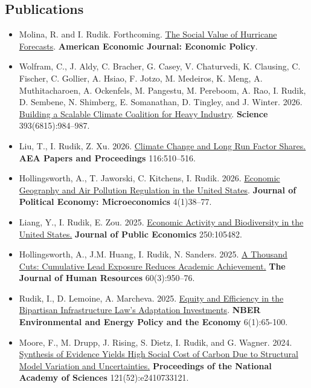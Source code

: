 \documentclass[11pt]{res} %
\begin{document}
\begin{resume}
\subsection{Publications}
\begin{itemize}
	\item[] Molina, R. and I. Rudik. Forthcoming. \href{https://www.nber.org/papers/w32548}{The Social Value of Hurricane Forecasts}. \textbf{American Economic Journal: Economic Policy}.
	\item[] Wolfram, C., J. Aldy, C. Bracher, G. Casey, V. Chaturvedi, K. Clausing, C. Fischer, C. Gollier, A. Hsiao, F. Jotzo, M. Medeiros, K. Meng, A. Muthitacharoen, A. Ockenfels, M. Pangestu, M. Pereboom, A. Rao, I. Rudik, D. Sembene, N. Shimberg, E. Somanathan, D. Tingley, and J. Winter. 2026. \href{https://www.science.org/doi/abs/10.1126/science.aef7190}{Building a Scalable Climate Coalition for Heavy Industry}. \textbf{Science} 393(6815):984--987.
	\item[] Liu, T., I. Rudik, Z. Xu. 2026. \href{https://pubs.aeaweb.org/doi/pdfplus/10.1257/pandp.20261025}{Climate Change and Long Run Factor Shares.} \textbf{AEA Papers and Proceedings} 116:510–516.
	\item[] Hollingsworth, A., T. Jaworski, C. Kitchens, I. Rudik. 2026. \href{https://www.journals.uchicago.edu/doi/10.1086/735784}{Economic Geography and Air Pollution Regulation in the United States}. \textbf{Journal of Political Economy: Microeconomics} 4(1)38--77.
	\item[] Liang, Y., I. Rudik, E. Zou. 2025. \href{https://www.sciencedirect.com/science/article/pii/S004727272500180X}{Economic Activity and Biodiversity in the United States.} \textbf{Journal of Public Economics} 250:105482.
	\item[] Hollingsworth, A., J.M. Huang, I. Rudik, N. Sanders. 2025. \href{https://www.nber.org/papers/w28250}{A Thousand Cuts: Cumulative Lead Exposure Reduces Academic Achievement.} \textbf{The Journal of Human Resources} 60(3):950--76.
	\item[] Rudik, I., D. Lemoine, A. Marcheva. 2025. \href{https://www.nber.org/books-and-chapters/environmental-and-energy-policy-and-economy-volume-6/equity-and-efficiency-bipartisan-infrastructure-laws-adaptation-investments}{Equity and Efficiency in the Bipartisan Infrastructure Law’s Adaptation Investments}. \textbf{NBER Environmental and Energy Policy and the Economy} 6(1):65-100.
	\item[] Moore, F., M. Drupp, J. Rising, S. Dietz, I. Rudik, and G. Wagner. 2024. \href{https://www.pnas.org/doi/10.1073/pnas.2410733121}{Synthesis of Evidence Yields High Social Cost of Carbon Due to Structural Model Variation and Uncertainties.} \textbf{Proceedings of the National Academy of Sciences} 121(52):e2410733121.

\end{itemize}
\end{resume}
\end{document}
